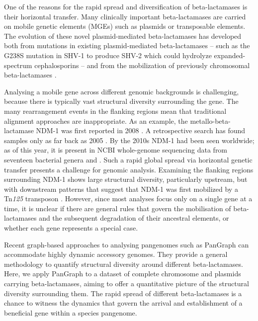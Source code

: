 \documentclass[aps,rmp,preprint,superscriptaddress,10pt,twocolumn]{revtex4-1}
\begin{document}
One of the reasons for the rapid spread and diversification of beta-lactamases is their horizontal transfer. Many clinically important beta-lactamases are carried on mobile genetic elements (MGEs) such as plasmids or transposable elements. The evolution of these novel plasmid-mediated beta-lactamases has developed both from mutations in existing plasmid-mediated beta-lactamases {--} such as the G238S mutation in SHV-1 to produce SHV-2 which could hydrolyze expanded-spectrum cephalosporins \cite{Bradford2001} {--} and from the mobilization of previously chromosomal beta-lactamases \cite{Bush2020}. \par

Analysing a mobile gene across different genomic backgrounds is challenging, because there is typically vast structural diversity surrounding the gene. The many rearrangement events in the flanking regions mean that traditional alignment approaches are inappropriate. As an example, the metallo-beta-lactamase NDM-1 was first reported in 2008 \cite{Yong2009}. A retrospective search has found samples only as far back as 2005 \cite{Jones2014}. By the 2010s NDM-1 had been seen worldwide; as of this year, it is present in NCBI whole-genome sequencing data from seventeen bacterial genera \cite{CARD2023} and . Such a rapid global spread via horizontal genetic transfer presents a challenge for genomic analysis. Examining the flanking regions surrounding NDM-1 shows large structural diversity, particularly upstream, but with downstream patterns that suggest that NDM-1 was first mobilized by a Tn\textit{125} transposon \cite{Toleman2012, Acman2022}. However, since most analyses focus only on a single gene at a time, it is unclear if there are general rules that govern the mobilisation of beta-lactamases and the subsequent degradation of their ancestral elements, or whether each gene represents a special case. \par 

Recent graph-based approaches to analysing pangenomes such as PanGraph \cite{Noll2022} can accommodate highly dynamic accessory genomes. They provide a general methodology to quantify structural diversity around different beta-lactamases. Here, we apply PanGraph to a dataset of complete chromosome and plasmids carrying beta-lactamases, aiming to offer a quantitative picture of the structural diversity surrounding them. The rapid spread of different beta-lactamases is a chance to witness the dynamics that govern the arrival and establishment of a beneficial gene within a species pangenome. 
\end{document}
